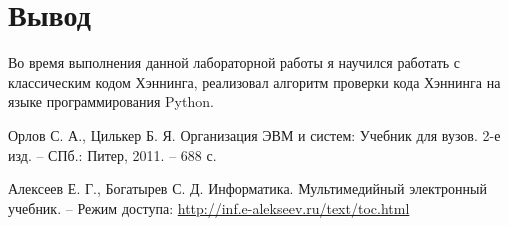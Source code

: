 \section{Вывод}
Во время выполнения данной лабораторной работы я научился работать с классическим
кодом Хэннинга, реализовал алгоритм проверки кода Хэннинга на языке программирования Python.

\clearpage
\begin{thebibliography}{9}
\bibitem{} Орлов С. А., Цилькер Б. Я. Организация ЭВМ и систем: Учебник для вузов. 2-е изд. -- СПб.: Питер, 2011. -- 688 с.

\bibitem{} Алексеев Е. Г., Богатырев С. Д. Информатика. Мультимедийный электронный учебник. – Режим доступа: \url{http://inf.e-alekseev.ru/text/toc.html}

\end{thebibliography}